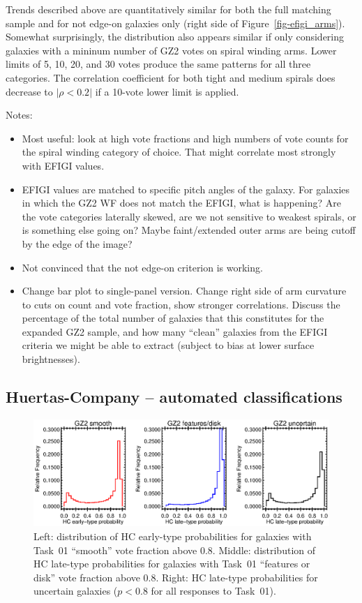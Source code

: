 \documentclass[useAMS,usenatbib]{mn2e}
\begin{document}
Trends described above are quantitatively similar for both the full matching sample and for not edge-on galaxies only (right side of Figure~\ref{fig-efigi_arms}). Somewhat surprisingly, the distribution also appears similar if only considering galaxies with a mininum number of GZ2 votes on spiral winding arms. Lower limits of 5, 10, 20, and 30 votes produce the same patterns for all three categories. The correlation coefficient for both tight and medium spirals does decrease to $|\rho<0.2|$ if a 10-vote lower limit is applied. 

Notes:
\begin{itemize}
\item Most useful: look at high vote fractions and high numbers of vote counts for the spiral winding category of choice. That might correlate most strongly with EFIGI values. 

\item EFIGI values are matched to specific pitch angles of the galaxy. For galaxies in which the GZ2 WF does not match the EFIGI, what is happening? Are the vote categories laterally skewed, are we not sensitive to weakest spirals, or is something else going on? Maybe faint/extended outer arms are being cutoff by the edge of the image?

\item Not convinced that the not edge-on criterion is working. 

\item Change bar plot to single-panel version. Change right side of arm curvature to cuts on count and vote fraction, show stronger correlations. Discuss the percentage of the total number of galaxies that this constitutes for the expanded GZ2 sample, and how many ``clean'' galaxies from the EFIGI criteria we might be able to extract (subject to bias at lower surface brightnesses).
\end{itemize}

\subsection{Huertas-Company -- automated classifications}

\begin{figure}
\includegraphics[angle=0,width=7.0in]{figures/hc_histogram.eps}
\caption{Left: distribution of HC early-type probabilities for galaxies with Task~01 ``smooth'' vote fraction above 0.8. Middle: distribution of HC late-type probabilities for galaxies with Task~01 ``features or disk'' vote fraction above 0.8. Right: HC late-type probabilities for uncertain galaxies ($p<0.8$ for all responses to Task~01). 
\label{fig-hc_histogram}}
\end{figure}
\end{document}

